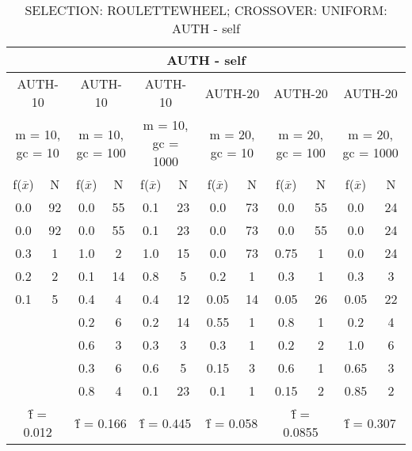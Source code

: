 \begin{table}[H]
	\centering
	\caption{SELECTION: ROULETTEWHEEL; CROSSOVER: UNIFORM: AUTH - self}
	\begin{adjustbox}{width=1\textwidth}
		\begin{tabular}{ |c|c||c|c||c|c||c|c||c|c||c|c| }
			\hline
			\multicolumn{12}{|c|}{AUTH - self} \\
			\hline
			\multicolumn{2}{|c||}{AUTH-10} & \multicolumn{2}{c||}{AUTH-10} & \multicolumn{2}{c||}{AUTH-10} & \multicolumn{2}{c||}{AUTH-20} & \multicolumn{2}{c||}{AUTH-20} & \multicolumn{2}{c|}{AUTH-20}\\
			\hline
			\multicolumn{2}{|c||}{m = 10, gc = 10} & \multicolumn{2}{c||}{m = 10, gc = 100} & \multicolumn{2}{c||}{m = 10, gc = 1000} & \multicolumn{2}{c||}{m = 20, gc = 10} & \multicolumn{2}{c||}{m = 20, gc = 100} & \multicolumn{2}{c|}{m = 20, gc = 1000}\\
			\hline
			f($\bar{x}$) & N & f($\bar{x}$) & N & f($\bar{x}$) & N & f($\bar{x}$) & N & f($\bar{x}$) & N & f($\bar{x}$) & N\\
			\hline
			\hline
			0.0 & 92 & 0.0 & 55 & 0.1 & 23 & 0.0 & 73 & 0.0 & 55 & 0.0 & 24\\
			\hline
			0.0 & 92 & 0.0 & 55 & 0.1 & 23 & 0.0 & 73 & 0.0 & 55 & 0.0 & 24\\
			0.3 & 1 & 1.0 & 2 & 1.0 & 15 & 0.0 & 73 & 0.75 & 1 & 0.0 & 24\\
			0.2 & 2 & 0.1 & 14 & 0.8 & 5 & 0.2 & 1 & 0.3 & 1 & 0.3 & 3\\
			0.1 & 5 & 0.4 & 4 & 0.4 & 12 & 0.05 & 14 & 0.05 & 26 & 0.05 & 22\\
			&   & 0.2 & 6 & 0.2 & 14 & 0.55 & 1 & 0.8 & 1 & 0.2 & 4\\
			&   & 0.6 & 3 & 0.3 & 3 & 0.3 & 1 & 0.2 & 2 & 1.0 & 6\\
			&   & 0.3 & 6 & 0.6 & 5 & 0.15 & 3 & 0.6 & 1 & 0.65 & 3\\
			&   & 0.8 & 4 & 0.1 & 23 & 0.1 & 1 & 0.15 & 2 & 0.85 & 2\\
			\hline
			\multicolumn{2}{|c||}{\^{f} = 0.012} & \multicolumn{2}{c||}{\^{f} = 0.166} & \multicolumn{2}{c||}{\^{f} = 0.445} & \multicolumn{2}{c||}{\^{f} = 0.058} & \multicolumn{2}{c||}{\^{f} = 0.0855} & \multicolumn{2}{c|}{\^{f} = 0.307}\\
			\hline
		\end{tabular}
	\end{adjustbox}
\end{table}
